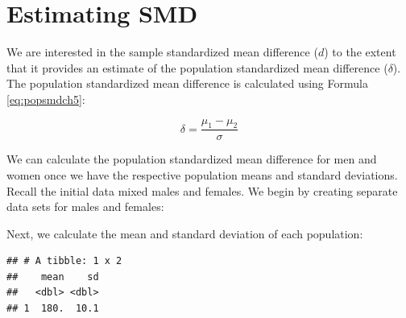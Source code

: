 \documentclass[
]{krantz}
\makeatletter
\newenvironment{Shaded}{\begin{snugshade}}{\end{snugshade}}
\newcommand{\DataTypeTok}[1]{\textcolor[rgb]{0.27,0.27,0.27}{#1}}
\newcommand{\KeywordTok}[1]{\textcolor[rgb]{0.27,0.27,0.27}{\textbf{#1}}}
\newcommand{\NormalTok}[1]{#1}
\newcommand{\OperatorTok}[1]{\textcolor[rgb]{0.43,0.43,0.43}{\textbf{#1}}}
\newcommand{\StringTok}[1]{\textcolor[rgb]{0.5,0.5,0.5}{#1}}
\newenvironment{kframe}{%
\medskip{}
\setlength{\fboxsep}{.8em}
 \def\at@end@of@kframe{}%
 \ifinner\ifhmode%
  \def\at@end@of@kframe{\end{minipage}}%
  \begin{minipage}{\columnwidth}%
 \fi\fi%
 \def\FrameCommand##1{\hskip\@totalleftmargin \hskip-\fboxsep
 \colorbox{shadecolor}{##1}\hskip-\fboxsep
     \hskip-\linewidth \hskip-\@totalleftmargin \hskip\columnwidth}%
 \MakeFramed {\advance\hsize-\width
   \@totalleftmargin\z@ \linewidth\hsize
   \@setminipage}}%
 {\par\unskip\endMakeFramed%
 \at@end@of@kframe}
\renewenvironment{Shaded}{\begin{kframe}}{\end{kframe}}
\makeatother
\begin{document}
\hypertarget{estimating-smd}{%
\section{Estimating SMD}\label{estimating-smd}}

We are interested in the sample standardized mean difference (\(d\)) to the extent that it provides an estimate of the population standardized mean difference (\(\delta\)). The population standardized mean difference is calculated using Formula \eqref{eq:popsmdch5}:

\begin{equation} 
\delta  = \frac{\mu_{1} - \mu_{2}}{\sigma} 
      \label{eq:popsmdch5}
\end{equation}

We can calculate the population standardized mean difference for men and women once we have the respective population means and standard deviations. Recall the initial data mixed males and females. We begin by creating separate data sets for males and females:

\begin{Shaded}
\end{Shaded}

Next, we calculate the mean and standard deviation of each population:

\begin{Shaded}
\end{Shaded}

\begin{verbatim}
## # A tibble: 1 x 2
##    mean    sd
##   <dbl> <dbl>
## 1  180.  10.1
\end{verbatim}
\end{document}
